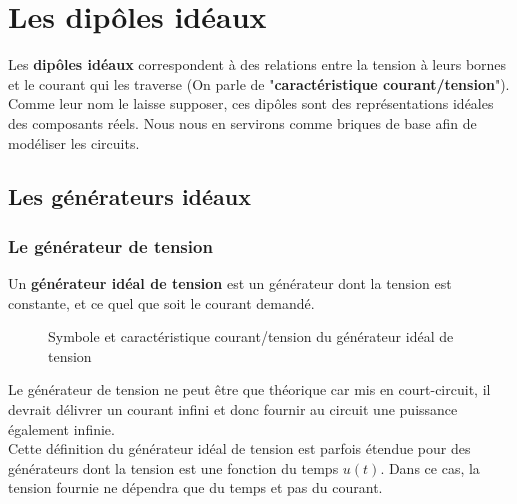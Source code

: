 \chapter{ Les dipôles idéaux }

Les \textbf{dipôles idéaux} correspondent à des relations entre la tension à leurs bornes et le courant qui les traverse (On parle de "\textbf{caractéristique courant/tension}"). Comme leur nom le laisse supposer, ces dipôles sont des représentations idéales des composants réels. Nous nous en servirons comme briques de base afin de modéliser les circuits. 

\section{Les générateurs idéaux}

\subsection{ Le générateur de tension }

Un \textbf{générateur idéal de tension} est un générateur dont la tension est constante, et ce quel que soit le courant demandé.

\begin{figure}[!h]
\begin{center}

\hspace{1cm}

\end{center}
\caption{ Symbole et caractéristique courant/tension du générateur idéal de tension}
\end{figure}

Le générateur de tension ne peut être que théorique car mis en court-circuit, il devrait délivrer un courant infini et donc fournir au circuit une puissance également infinie.\\

Cette définition du générateur idéal de tension est parfois étendue pour des générateurs dont la tension est une fonction du temps $u(t)$. Dans ce cas, la tension fournie ne dépendra que du temps et pas du courant. 


